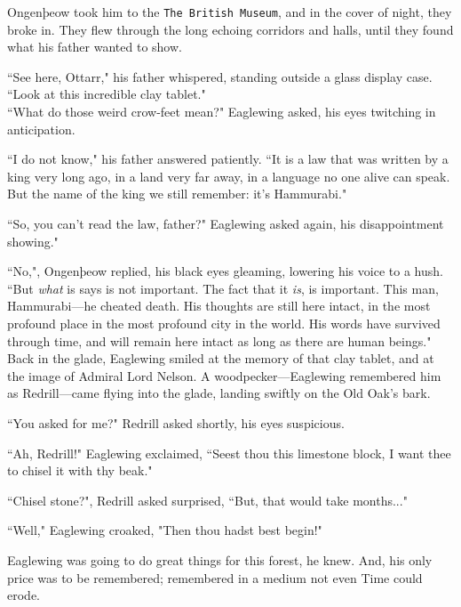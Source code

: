 Ongenþeow took him to the \texttt{The British Museum}, and in the cover of night, they broke in.
They flew through the long echoing corridors and halls, until they found what his father wanted to show.

``See here, Ottarr," his father whispered, standing outside a glass display case.
``Look at this incredible clay tablet."\\



``What do those weird crow-feet mean?" Eaglewing asked, his eyes twitching in anticipation.

``I do not know," his father answered patiently. ``It is a law that was written by a king very long ago, in a land very far away, in a language no one alive can speak. But the name of the king we still remember: it's Hammurabi."

``So, you can't read the law, father?" Eaglewing asked again, his disappointment showing."

``No,", Ongenþeow replied, his black eyes gleaming, lowering his voice to a hush. ``But \textit{what} is says is not important. The fact that it \textit{is}, is important.
This man, Hammurabi---he cheated death.
His thoughts are still here intact, in the most profound place in the most profound city in the world.
His words have survived through time, and will remain here intact as long as there are human beings."\\

Back in the glade, Eaglewing smiled at the memory of that clay tablet, and at the image of Admiral Lord Nelson.
A woodpecker---Eaglewing remembered him as Redrill---came flying into the glade, landing swiftly on the Old Oak's bark.

``You asked for me?" Redrill asked shortly, his eyes suspicious.

``Ah, Redrill!" Eaglewing exclaimed, ``Seest thou this limestone block, I want thee to chisel it with thy beak."

``Chisel stone?", Redrill asked surprised, ``But, that would take months..."

``Well," Eaglewing croaked, "Then thou hadst best begin!"

Eaglewing was going to do great things for this forest, he knew.
And, his only price was to be remembered; remembered in a medium not even Time could erode.

